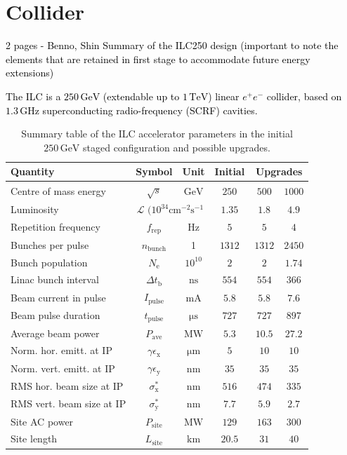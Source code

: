 \documentclass[%
 reprint,
 amsmath,amssymb,
 aps,
]{revtex4-1}
\newcommand{\juan}[1]{\textcolor{black}{{#1}}}
\newcommand{\todo}[1]{\textcolor{black}{{#1}}}
\begin{document}
\section{\label{sec:collider}Collider}

\todo{ 2 pages - Benno, Shin
Summary of the ILC250 design (important to note the elements that are retained in first stage to accommodate future energy extensions) }



\juan{The ILC is a $250\,{\mathrm{GeV}}$ (extendable up to $1\,{\mathrm{TeV}}$) linear $e^+e^-$ collider, based on $1.3\,{\mathrm{GHz}}$ superconducting radio-frequency (SCRF) cavities.}

\begin{table}
\begin{tabular}{lccccc}
Quantity & Symbol & Unit & Initial &  \multicolumn{2}{c}{Upgrades} \\
\hline
Centre of mass energy & $\sqrt{s}$ & ${\mathrm{GeV}}$ & $250$ & $500$ & $1000$ \\
Luminosity & \multicolumn{2}{c}{${\mathcal{L}}$ $(10^{34}{\mathrm{cm^{-2}s^{-1}}}$})& $1.35$ & $1.8$ & $4.9$ \\
Repetition frequency &$f_{\mathrm{rep}}$ & ${\mathrm{Hz}}$  & $5$ & $5$ & $4$ \\
Bunches per pulse  &$n_{\mathrm{bunch}}$ & 1  & $1312$ & $1312$ & $2450$ \\
Bunch population  &$N_{\mathrm{e}}$ & $10^{10}$ &$2$ & $2$ & $1.74$ \\
Linac bunch interval & $\Delta t_{\mathrm{b}}$ & ${\mathrm{ns}}$ & $554$ & $554$ & $366$ \\
Beam current in pulse & $I_{\mathrm{pulse}}$ & ${\mathrm{mA}}$& $5.8$ & $5.8$ & $7.6$  \\
Beam pulse duration  & $t_{\mathrm{pulse}}$ & ${\mathrm{\mu s}}$ &$727$ & $727$ & $897$ \\
Average beam power  & $P_{\mathrm{ave}}$   & ${\mathrm{MW}}$ & $5.3$   &$10.5$  & $27.2$ \\  
Norm. hor. emitt. at IP & $\gamma\epsilon_{\mathrm{x}}$ & ${\mathrm{\mu m}}$& $5$ & $10$ & $10$  \\ 
Norm. vert. emitt. at IP & $\gamma\epsilon_{\mathrm{y}}$ & ${\mathrm{nm}}$ & $35$ & $35$ & $35$ \\ 
RMS hor. beam size at IP  & $\sigma^*_{\mathrm{x}}$ & ${\mathrm{nm}}$  & $516$ & $474$ & $335$ \\
RMS vert. beam size at IP &$\sigma^*_{\mathrm{y}}$ & ${\mathrm{nm}}$ & $7.7$  & $5.9$ & $2.7$ \\
Site AC power  & $P_{\mathrm{site}}$ &  ${\mathrm{MW}}$ & $129$ & $163$ & $300$ \\
Site length & $L_{\mathrm{site}}$ &  ${\mathrm{km}}$ & $20.5$ & $31$ & $40$ \\
\end{tabular}
\caption{Summary table of the ILC accelerator parameters in the initial $250\,{\mathrm{GeV}}$ staged configuration
and possible upgrades.
\label{tab:ilc-params}}
\end{table}
\end{document}
